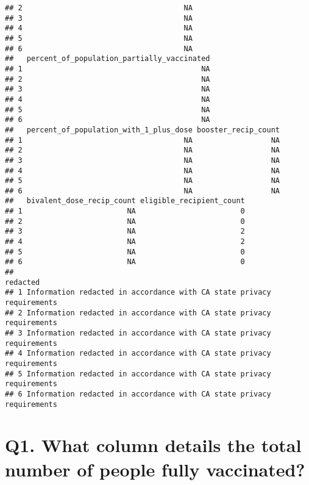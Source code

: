 \documentclass[
]{article}
\newenvironment{Shaded}{\begin{snugshade}}{\end{snugshade}}
\newcommand{\FunctionTok}[1]{\textcolor[rgb]{0.00,0.00,0.00}{#1}}
\newcommand{\NormalTok}[1]{#1}
\newcommand{\SpecialCharTok}[1]{\textcolor[rgb]{0.00,0.00,0.00}{#1}}
\begin{document}
\begin{verbatim}
## 2                                     NA
## 3                                     NA
## 4                                     NA
## 5                                     NA
## 6                                     NA
##   percent_of_population_partially_vaccinated
## 1                                         NA
## 2                                         NA
## 3                                         NA
## 4                                         NA
## 5                                         NA
## 6                                         NA
##   percent_of_population_with_1_plus_dose booster_recip_count
## 1                                     NA                  NA
## 2                                     NA                  NA
## 3                                     NA                  NA
## 4                                     NA                  NA
## 5                                     NA                  NA
## 6                                     NA                  NA
##   bivalent_dose_recip_count eligible_recipient_count
## 1                        NA                        0
## 2                        NA                        0
## 3                        NA                        2
## 4                        NA                        2
## 5                        NA                        0
## 6                        NA                        0
##                                                                redacted
## 1 Information redacted in accordance with CA state privacy requirements
## 2 Information redacted in accordance with CA state privacy requirements
## 3 Information redacted in accordance with CA state privacy requirements
## 4 Information redacted in accordance with CA state privacy requirements
## 5 Information redacted in accordance with CA state privacy requirements
## 6 Information redacted in accordance with CA state privacy requirements
\end{verbatim}

\hypertarget{q1.-what-column-details-the-total-number-of-people-fully-vaccinated}{%
\section{Q1. What column details the total number of people fully
vaccinated?}\label{q1.-what-column-details-the-total-number-of-people-fully-vaccinated}}

\begin{Shaded}
\end{Shaded}
\end{document}
